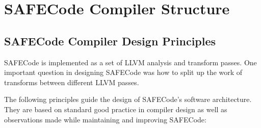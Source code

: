 \section{SAFECode Compiler Structure}
\label{section:struct}

\subsection{SAFECode Compiler Design Principles}
\label{section:struct:principles}

SAFECode is implemented as a set of LLVM analysis and transform
passes.  One important question in designing SAFECode was how to split
up the work of transforms between different LLVM passes.

The following principles guide the design of SAFECode's software
architecture.  They are based on standard good practice in compiler
design as well as observations made while maintaining and improving
SAFECode:

